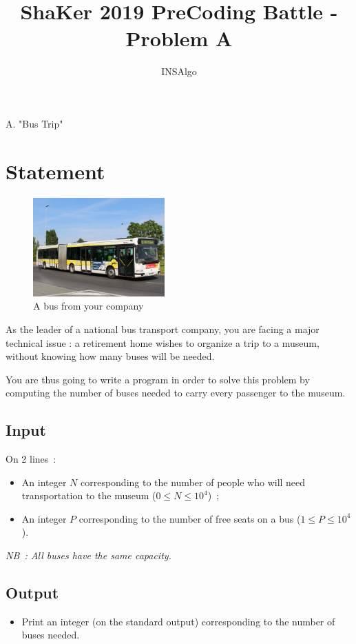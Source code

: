 \documentclass[12pt,a4paper]{report}
\author{INSAlgo}
\title{ShaKer 2019 PreCoding Battle - Problem A}
\begin{document}
\begin{center}
	{\Large A. "Bus Trip"}
	\bigskip
\end{center}

\section*{Statement}

\begin{figure}
    \centering
    \captionsetup{justification=centering}
    \includegraphics[width=0.45\textwidth]{bus.jpg}
    \caption*{A bus from your company}
\end{figure}
As the leader of a national bus transport company, you are facing a major technical issue : a retirement home wishes to organize a trip to a museum, without knowing how many buses will be needed.

You are thus going to write a program in order to solve this problem by computing the number of buses needed to carry every passenger to the museum.

\subsection*{Input}%
On 2 lines~:
\begin{itemize}
\item An integer $N$ corresponding to the number of people who will need transportation to the museum ($0 \leq N \leq 10^{4}$)~;
\item An integer $P$ corresponding to the number of free seats on a bus ($1 \leq P \leq 10^{4}$).
\end{itemize}
\textit{NB~: All buses have the same capacity.}

\subsection*{Output}
\begin{itemize} %
\item Print an integer (on the standard output) corresponding to the number of buses needed.
\end{itemize}
\end{document}
